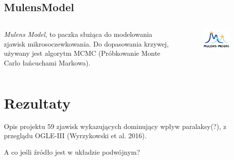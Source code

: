 \documentclass{beamer}
\begin{document}
\subsection{MulensModel}
\begin{frame}
    \begin{columns}
        \begin{column}{0.5\linewidth}
            \emph{Mulens Model}, to paczka służąca do modelowania zjawisk mikrosoczewkowania.
            Do dopasowania krzywej, używany jest algorytm MCMC (Próbkowanie Monte Carlo łańcuchami Markowa).

        \end{column}

        \begin{column}{0.5\linewidth}
            \begin{figure}
                \includegraphics[width = \textwidth]{logoMM_crop_4_372x260.png}
            \end{figure}
        \end{column}
    \end{columns}
\end{frame}

\section{Rezultaty}

\begin{frame}{Opis projektu}
    59 zjawisk wykazujących dominujący wpływ paralaksy(?), z przeglądu OGLE-III (Wyrzykowski et al. 2016).

    \bigskip
    \bigskip

    A co jeśli źródło jest w układzie podwójnym?
\end{frame}
\end{document}
